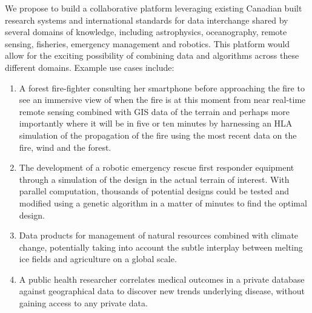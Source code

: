 We propose to build a collaborative platform leveraging existing
Canadian built research systems and international standards for data
interchange shared by several domains of knowledge, including
astrophysics, oceanography, remote sensing, fisheries, emergency
management and robotics.  This platform would allow for the exciting
possibility of combining data and algorithms across these different
domains.  Example use cases include:
\begin{enumerate}
\item A forest fire-fighter consulting her smartphone before
  approaching the fire to see an immersive view of when the fire is at
  this moment from near real-time remote sensing combined with GIS
  data of the terrain and perhaps more importantly where it will be in
  five or ten minutes by harnessing an HLA simulation of the
  propagation of the fire using the most recent data on the fire, wind
  and the forest.
\item The development of a robotic emergency rescue first responder
  equipment through a simulation of the design in the actual terrain
  of interest.  With parallel computation, thousands of potential
  designs could be tested and modified using a genetic algorithm in a
  matter of minutes to find the optimal design.
\item Data products for management of natural resources combined with
  climate change, potentially taking into account the subtle interplay
  between melting ice fields and agriculture on a global scale.
\item A public health researcher correlates medical outcomes in a
  private database against geographical data to discover new trends
  underlying disease, without gaining access to any private data.
\end{enumerate}
